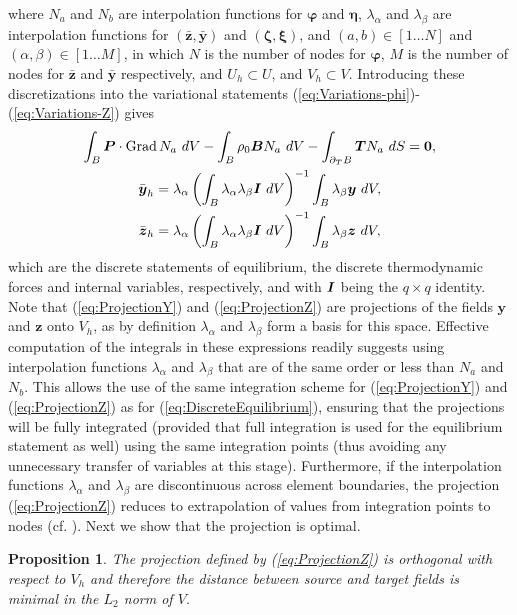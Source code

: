 \documentclass[12pt]{article}
\newcommand{\mbs}[1]{\boldsymbol{#1}}
\newtheorem*{proposition}{Proposition}
\def\bP{{\mbs{P}}} \def\bQ{{\mbs{Q}}} \def\bR{{\mbs{R}}}
\def\by{{\mbs{y}}} \def\bz{{\mbs{z}}}
\def\bzeta{{\mbs{\zeta}}}
\def\beeta{{\mbs{\eta}}}
\def\bxi{{\mbs{\xi}}}
\def\bvarphi{{\mbs{\varphi}}}
\DeclareMathOperator{\Grad}{Grad}
\begin{document}
where $N_a$ and $N_b$ are interpolation functions for $\bvarphi$ and
$\beeta$, $\lambda_\alpha$ and $\lambda_\beta$ are interpolation
functions for $(\bar{\bz}, \bar{\by})$ and $(\bzeta, \bxi)$, and
$(a,b) \in [1 \ldots N]$ and $(\alpha, \beta) \in [1 \ldots M]$, in
which $N$ is the number of nodes for $\bvarphi$, $M$ is the number of
nodes for $\bar{\bz}$ and $\bar{\by}$ respectively, and $U_h \subset
U$, and $V_h \subset V$. Introducing these discretizations
into the variational statements
(\ref{eq:Variations-phi})-(\ref{eq:Variations-Z}) gives
\begin{gather}
  \int_B \bP \cdot \Grad N_a \ dV
  -
  \int_B \rho_0 \bB N_a \ dV
  -
  \int_{\partial_T B} \bT N_a \ dS
  =
  \mathbf{0}, \label{eq:DiscreteEquilibrium}
  \\
  \bar{\by}_h
  =
  \lambda_\alpha
  \left(
  \int_B \lambda_\alpha \lambda_\beta \bI \ dV
  \right)^{-1}
  \int_B \lambda_\beta \by \ dV, \label{eq:ProjectionY}
  \\
  \bar{\bz}_h
  =
  \lambda_\alpha
  \left(
  \int_B \lambda_\alpha \lambda_\beta \bI \ dV
  \right)^{-1}
  \int_B \lambda_\beta \bz \ dV, \label{eq:ProjectionZ}
\end{gather}
which are the discrete statements of equilibrium, the discrete
thermodynamic forces and internal variables, respectively, and with
$\bI$ being the $q \times q$ identity. Note that
(\ref{eq:ProjectionY}) and (\ref{eq:ProjectionZ}) are projections of
the fields $\by$ and $\bz$ onto $V_h$, as by definition
$\lambda_\alpha$ and $\lambda_\beta$ form a basis for this space.
Effective computation of the integrals in these expressions readily
suggests using interpolation functions $\lambda_\alpha$ and
$\lambda_\beta$ that are of the same order or less than $N_a$ and
$N_b$. This allows the use of the same integration scheme for
(\ref{eq:ProjectionY}) and (\ref{eq:ProjectionZ}) as for
(\ref{eq:DiscreteEquilibrium}), ensuring that the projections will be
fully integrated (provided that full integration is used for the
equilibrium statement as well) using the same integration points (thus
avoiding any unnecessary transfer of variables at this
stage). Furthermore, if the interpolation functions $\lambda_\alpha$
and $\lambda_\beta$ are discontinuous across element boundaries, the
projection (\ref{eq:ProjectionZ}) reduces to extrapolation of values
from integration points to nodes (cf. \citet{Ortiz.Quigley:1991,
  Radovitzky.Ortiz:1999}).  Next we show that the projection is
optimal.

\begin{proposition}
  The projection defined by (\ref{eq:ProjectionZ}) is orthogonal with
  respect to $V_h$ and therefore the distance between source and
  target fields is minimal in the $L_2$ norm of $V$.
\end{proposition}
\end{document}
